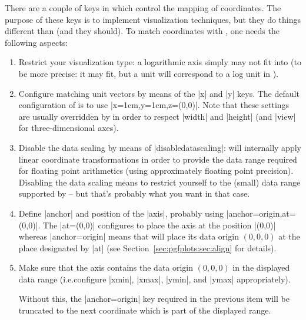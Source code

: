 There are a couple of keys in \PGFPlots{} which control the mapping of
coordinates. The purpose of these keys is to implement visualization
techniques, but they do things different than \Tikz{} (and they should). To
match coordinates with \Tikz{}, one needs the following aspects:
%
\begin{enumerate}
    \item Restrict your visualization type: a logarithmic axis simply may not
        fit into \Tikz{} (to be more precise: it may fit, but a \Tikz{} unit
        will correspond to a log unit in \PGFPlots).
    \item Configure matching unit vectors by means of the |x| and |y| keys.
        The default configuration of \Tikz{} is to use
        |x=1cm,y=1cm,z={(0,0)}|. Note that these settings are usually
        overridden by \PGFPlots{} in order to respect |width| and |height|
        (and |view| for three-dimensional axes).
    \item Disable the data scaling by means of |disabledatascaling|:
        \PGFPlots{} will internally apply linear coordinate transformations
        in order to provide the data range required for floating point
        arithmetics (using approximately floating point precision). Disabling
        the data scaling means to restrict yourself to the (small) data range
        supported by \Tikz{} -- but that's probably what you want in that
        case.
    \item Define |anchor| and position of the |axis|, probably using
        |anchor=origin,at={(0,0)}|. The |at={(0,0)}| configures \PGFPlots{}
        to place the axis at the \Tikz{} position |(0,0)| whereas
        |anchor=origin| means that \PGFPlots{} will place its data origin
        $(0,0,0)$ at the place designated by |at| (see
        Section~\ref{sec:pgfplots:sec:align} for details).
    \item Make sure that the \PGFPlots{} axis contains the data origin
        $(0,0,0)$ in the displayed data range (i.e.\@ configure |xmin|,
        |xmax|, |ymin|, and |ymax| appropriately).

        Without this, the |anchor=origin| key required in the previous item
        will be truncated to the next coordinate which is part of the displayed
        range.
\end{enumerate}

